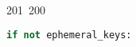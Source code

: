 201~200~\documentclass{article}
\begin{document}
\begin{lstlisting}[language=Python, caption=Unlock messages]
	                                                                                                                                                                                                                                                                                                	                                                                                                                                        	    	                                                                                                	                                                                                                                                                    if not ephemeral_keys:
	                                                                                                                                                                                                                                                                                                	                                                                                                                                        	    	                                                                                                	                                                                                                                                                            print("No messages are ready to be unlocked.")
	                                                                                                                                                                                                                                                                                                	                                                                                                                                        	    	                                                                                                	                                                                                                                                                                    return


\end{lstlisting}
\end{document}
